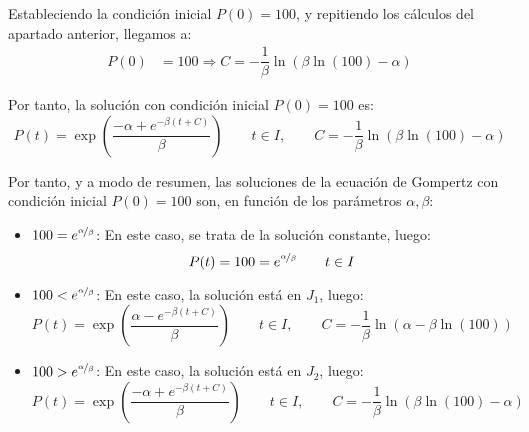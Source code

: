 \begin{ejercicio}
\begin{itemize}
        Estableciendo la condición inicial $P(0)=100$, y repitiendo los cálculos del apartado anterior, llegamos a:
        \begin{align*}
            P(0) &= 100 \Longrightarrow C=-\dfrac{1}{\beta}\ln(\beta\ln(100)-\alpha)
        \end{align*}

        Por tanto, la solución con condición inicial $P(0)=100$ es:
        \begin{equation*}
            P(t) = \exp\left(\dfrac{-\alpha + e^{-\beta(t + C)}}{\beta}\right) \qquad t\in I, \qquad C=-\dfrac{1}{\beta}\ln(\beta\ln(100)-\alpha)
        \end{equation*}
    \end{itemize}

    Por tanto, y a modo de resumen, las soluciones de la ecuación de Gompertz con condición inicial $P(0)=100$ son, en función de los parámetros $\alpha, \beta$:
    \begin{itemize}
        \item \ul{$100=e^{\nicefrac{\alpha}{\beta}}$}: En este caso, se trata de la solución constante, luego:
        \begin{equation*}
            P(t) = 100 = e^{\nicefrac{\alpha}{\beta}} \qquad t\in I
        \end{equation*}

        \item \ul{$100<e^{\nicefrac{\alpha}{\beta}}$}: En este caso, la solución está en $J_1$, luego:
        \begin{equation*}
            P(t) = \exp\left(\dfrac{\alpha - e^{-\beta(t + C)}}{\beta}\right) \qquad t\in I, \qquad C=-\dfrac{1}{\beta}\ln(\alpha-\beta\ln(100))
        \end{equation*}

        \item \ul{$100>e^{\nicefrac{\alpha}{\beta}}$}: En este caso, la solución está en $J_2$, luego:
        \begin{equation*}
            P(t) = \exp\left(\dfrac{-\alpha + e^{-\beta(t + C)}}{\beta}\right) \qquad t\in I, \qquad C=-\dfrac{1}{\beta}\ln(\beta\ln(100)-\alpha)
        \end{equation*}
    \end{itemize}

\end{ejercicio}

